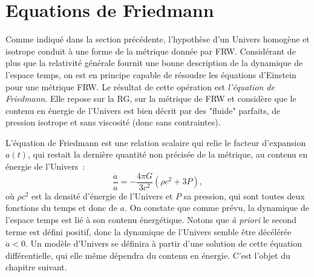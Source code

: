 \section{Equations de Friedmann}
Comme indiqué dans la section précédente, l'hypothèse d'un Univers homogène et isotrope conduit à une forme de la métrique donnée par FRW. Considérant de plus que la relativité générale fournit une bonne description de la dynamique de l'espace temps, on est en principe capable de résoudre les équations d'Einstein pour une métrique FRW. Le résultat de cette opération est \textit{l'équation de Friedmann}. Elle repose sur la RG, sur la métrique de FRW et considère que le contenu en énergie de l'Univers est bien décrit par des "fluide" parfaits, de pression isotrope et sans viscosité (donc sans contraintes).

L'équation de Friedmann est une relation scalaire qui relie le facteur d'expansion $a(t)$, qui restait la dernière quantité non précisée de la métrique, au contenu en énergie de l'Univers~:
\begin{equation}
\frac{\ddot a}{a}=-\frac{4\pi G}{3c^2}(\rho c^2 +3 P),
\label{e:friedmann}
\end{equation}
où $\rho c^2$ est la densité d'énergie de l'Univers et $P$ sa pression, qui sont toutes deux fonctions du temps et donc de $a$. On constate que comme prévu, la dynamique de l'espace temps est lié à son contenu énergétique. Notons que \textit{à priori} le second terme est défini positif, donc la dynamique de l'Univers semble être décélérée $\ddot a<0$. Un modèle d'Univers se définira à partir d'une solution de cette équation différentielle, qui elle même dépendra du contenu en énergie. C'est l'objet du chapitre suivant.
